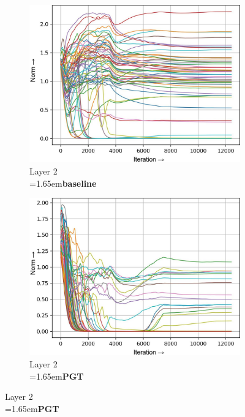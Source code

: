 \documentclass[runningheads]{llncs}
\newcommand{\forceindentb}{\parindent=1.65em\indent\parindent=0pt\relax}
\begin{document}
\begin{figure}[h]
\begin{subfigure}[t]{0.34\textwidth}
\includegraphics[width=\textwidth]{trimmed/baseline-w-layer-1-2}
\caption{Layer 2\\ \forceindentb\textbf{baseline}}
\end{subfigure}
\begin{subfigure}[t]{0.34\textwidth}
\includegraphics[width=\textwidth]{trimmed/pgt-w-layer-1-2}
\caption{Layer 2\\ \forceindentb\textbf{PGT}}
\end{subfigure}


\end{figure}
\end{document}
